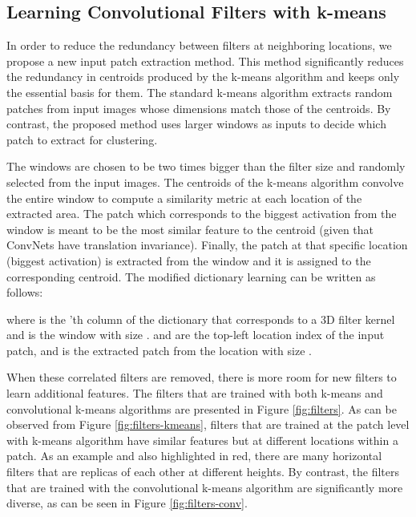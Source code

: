 \documentclass{article} \usepackage{iclr2016_workshop,times}
\begin{document}
\subsection{Learning Convolutional Filters with k-means}

In order to reduce the redundancy between filters at neighboring locations, we propose a new input patch extraction method. This method significantly reduces the redundancy in centroids produced by the k-means algorithm and keeps only the essential basis for them.
The standard k-means algorithm extracts random patches from input images whose dimensions match those of the centroids.
By contrast, the proposed method uses larger windows as inputs to decide which patch to extract for clustering.

The windows are chosen to be two times bigger than the filter size and randomly selected from the input images. The centroids of the k-means algorithm convolve the entire window to compute a similarity metric at each location of the extracted area.
The patch which corresponds to the biggest activation from the window is meant to be the most similar feature to the centroid (given that ConvNets have translation invariance).
Finally, the patch at that specific location (biggest activation) is extracted from the window and it is assigned to the corresponding centroid. The modified dictionary learning can be written as follows:



where  is the 'th column of the dictionary that corresponds to a  3D filter kernel  and  is the window with size .
 and  are the top-left location index of the input patch, and  is the extracted patch from the location  with size .

When these correlated filters are removed, there is more room for new filters to learn additional features.
The filters that are trained with both k-means and convolutional k-means algorithms are presented in Figure \ref{fig:filters}.
As can be observed from Figure \ref{fig:filters-kmeans}, filters that are trained at the patch level with k-means algorithm have similar features but at different locations within a patch.
As an example and also highlighted in red, there are many horizontal filters that are replicas of each other at different heights.
By contrast, the filters that are trained with the convolutional k-means algorithm are significantly more diverse, as can be seen in Figure \ref{fig:filters-conv}.
\end{document}
